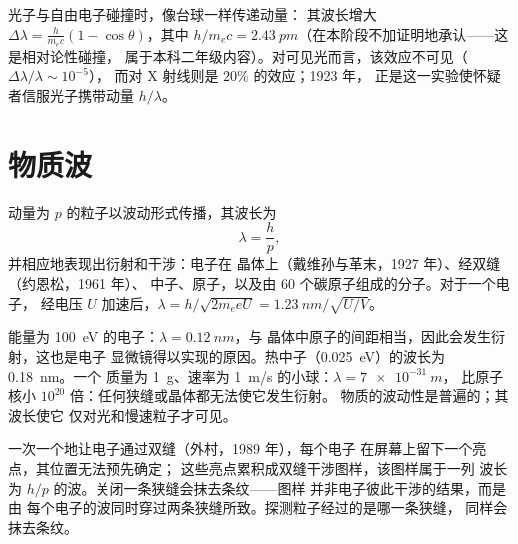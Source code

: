 \begin{remark}[康普顿散射]\label{rem:b1:quantum-introduction:compton}
光子与自由电子碰撞时，像台球一样传递动量：
其波长增大 $\Delta\lambda = \frac{h}{m_ec}(1 -
\cos\theta)$，其中 $h/m_ec = \qty{2.43}{pm}$（在本阶段不加证明地承认——这是相对论性碰撞，
属于本科二年级内容）。对可见光而言，该效应不可见（$\Delta\lambda/\lambda \sim 10^{-5}$），
而对 X 射线则是 $20\%$ 的效应；1923 年，
正是这一实验使怀疑者信服光子携带动量 $h/\lambda$。
\end{remark}

\section{物质波}

\begin{theorem}[德布罗意]\label{thm:b1:quantum-introduction:debroglie}
动量为 $p$ 的粒子以波动形式传播，其波长为
\[
\lambda = \frac{h}{p} ,
\]
并相应地表现出衍射和干涉：电子在
晶体上（戴维孙与革末，1927 年）、经双缝（约恩松，1961 年）、
中子、原子，以及由 60 个碳原子组成的分子。对于一个电子，
经电压 $U$ 加速后，$\lambda = h/\sqrt{2m_eeU} = \qty{1.23}{nm}/\sqrt{U/\unit{V}}$。
\end{theorem}
\admitted

\begin{example}[为何从未观察到它]\label{ex:b1:quantum-introduction:wavelengths}
能量为 \qty{100}{eV} 的电子：$\lambda = \qty{0.12}{nm}$，与
晶体中原子的间距相当，因此会发生衍射，这也是电子
显微镜得以实现的原因。热中子（\qty{0.025}{eV}）的波长为 \qty{0.18}{nm}。一个
质量为 \qty{1}{g}、速率为 \qty{1}{m/s} 的小球：$\lambda = \qty{7e-31}{m}$，
比原子核小 $10^{20}$ 倍：任何狭缝或晶体都无法使它发生衍射。
物质的波动性是普遍的；其波长使它
仅对光和慢速粒子才可见。
\end{example}

\begin{proposition}[单个粒子构成条纹]\label{prop:b1:quantum-introduction:buildup}
一次一个地让电子通过双缝（外村，1989 年），每个电子
在屏幕上留下一个亮点，其位置无法预先确定；
这些亮点累积成双缝干涉图样，该图样属于一列
波长为 $h/p$ 的波。关闭一条狭缝会抹去条纹——图样
并非电子彼此干涉的结果，而是由
每个电子的波同时穿过两条狭缝所致。探测粒子经过的是哪一条狭缝，
同样会抹去条纹。
\end{proposition}
\admitted

